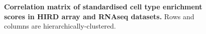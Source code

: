 \begin{figure}
\begin{subfigure}[b]{0.65\textwidth}
    \end{subfigure}
    \caption[
    ]{
        \textbf{Correlation matrix of standardised  cell type enrichment scores in \gls{HIRD} array and \gls{RNAseq} datasets.}
        Rows and columns are hierarchically-clustered.
    }
    \label{fig:hird_xCell_correlationMatrix}
\end{figure}

%
%
